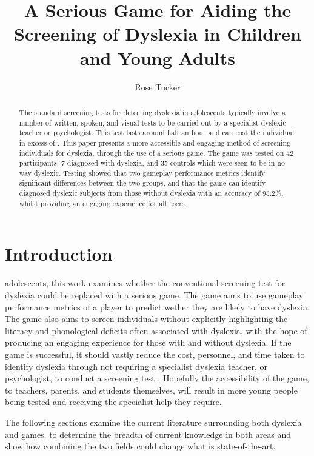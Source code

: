 \documentclass[journal]{IEEEtran}
\begin{document}
\title{\textbf{A Serious Game for Aiding the Screening of Dyslexia in Children and Young Adults}}
\author{Rose Tucker}

\maketitle


\begin{abstract}
The standard screening tests for detecting dyslexia in adolescents typically involve a number of written,
 spoken, and visual tests to be carried out by a specialist dyslexic teacher or psychologist.
This test lasts around half an hour and can cost the individual in excess of . 
This paper presents a more accessible and engaging method of screening individuals
 for dyslexia, through the use of a serious game. 
The game was tested on 42 participants, 7 diagnosed with dyslexia, and 35 controls which were seen to be in no way dyslexic. 
Testing showed that two gameplay performance metrics identify significant differences between the two groups, and that the game can identify diagnosed dyslexic subjects from those without dyslexia with an accuracy of 95.2\%, whilst providing an engaging experience for all users.
\end{abstract}

\section{Introduction}
 adolescents, this work examines whether the conventional screening
test for dyslexia could be replaced with a serious game. The game aims to use gameplay performance metrics of a player to predict wether they are likely to have dyslexia. The game also aims to screen individuals without explicitly highlighting the literacy and phonological deficits often associated with dyslexia, with the hope of 
producing an engaging experience for those with and without dyslexia. 
If the game is successful, it should vastly reduce the cost, personnel, and time taken to 
identify dyslexia through not requiring a specialist dyslexia teacher, or psychologist, to 
conduct a screening test \cite{bda, dast}. Hopefully the accessibility of the game, to 
teachers, parents, and students themselves, will result in more
young people being tested and receiving the specialist help they require.

The following sections examine the current literature surrounding both dyslexia and games, to determine the breadth of current knowledge in both areas and show how combining the two fields could change what is state-of-the-art. 
\end{document}
